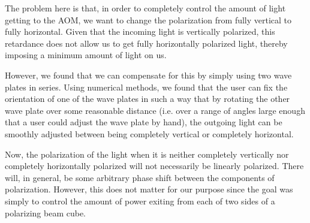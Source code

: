 The problem here is that, in order to completely control the amount of light getting to the AOM, we want to change the polarization from fully vertical to fully horizontal. Given that the incoming light is vertically polarized, this retardance does not allow us to get fully horizontally polarized light, thereby imposing a minimum amount of light on us.

However, we found that we can compensate for this by simply using two wave plates in series. Using numerical methods, we found that the user can fix the orientation of one of the wave plates in such a way that by rotating the other wave plate over some reasonable distance (i.e. over a range of angles large enough that a user could adjust the wave plate by hand), the outgoing light can be smoothly adjusted between being completely vertical or completely horizontal. 

Now, the polarization of the light when it is neither completely vertically nor completely horizontally polarized will not necessarily be linearly polarized. There will, in general, be some arbitrary phase shift between the components of polarization. However, this does not matter for our purpose since the goal was simply to control the amount of power exiting from each of two sides of a polarizing beam cube. 


